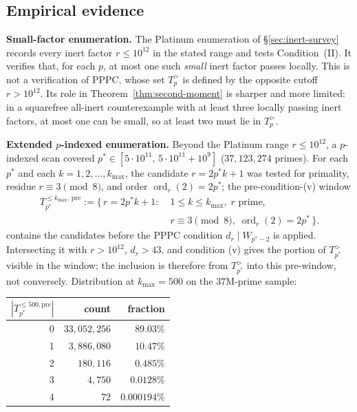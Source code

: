 \documentclass[11pt]{amsart}
\theoremstyle{plain}
\theoremstyle{definition}
\theoremstyle{remark}
\numberwithin{equation}{section}
\newcommand{\ord}{\operatorname{ord}}
\begin{document}
\subsection{Empirical evidence}\label{sec:empirical}

\textbf{Small-factor enumeration.} The Platinum enumeration of \S\ref{sec:inert-survey} records every inert factor $r \leq 10^{12}$ in the stated range and tests Condition~(II). It verifies that, for each $p$, at most one such \emph{small} inert factor passes locally. This is not a verification of PPPC, whose set $T_p^{>}$ is defined by the opposite cutoff $r>10^{12}$. Its role in Theorem~\ref{thm:second-moment} is sharper and more limited: in a squarefree all-inert counterexample with at least three locally passing inert factors, at most one can be small, so at least two must lie in $T_p^{>}$.

\textbf{Extended $p$-indexed enumeration.} Beyond the Platinum range $r \leq 10^{12}$, a $p$-indexed scan covered $p^\ast \in [5 \cdot 10^{11},\, 5 \cdot 10^{11} + 10^9]$ ($37{,}123{,}274$ primes). For each $p^\ast$ and each $k = 1, 2, \dots, k_{\max}$, the candidate $r = 2 p^\ast k + 1$ was tested for primality, residue $r \equiv 3 \pmod 8$, and order $\ord_r(2) = 2 p^\ast$; the pre-condition-(v) window
\[
  \begin{aligned}
  T_{p^\ast}^{\leq k_{\max},\,\mathrm{pre}} := \{\,r = 2 p^\ast k + 1 :\;& 1 \leq k \leq k_{\max},\; r \text{ prime},\\
  & r \equiv 3 \pmod 8,\; \ord_r(2) = 2 p^\ast\,\}.
  \end{aligned}
\]
contains the candidates before the PPPC condition $d_r \mid W_{p^\ast-2}$ is applied. Intersecting it with $r>10^{12}$, $d_r>43$, and condition (v) gives the portion of $T_{p^\ast}^{>}$ visible in the window; the inclusion is therefore from $T_{p^\ast}^{>}$ into this pre-window, not conversely. Distribution at $k_{\max} = 500$ on the $37$M-prime sample:

\begin{center}
\begin{tabular}{r r r}
\hline
$|T_{p^\ast}^{\leq 500,\mathrm{pre}}|$ & count & fraction \\
\hline
0 & $33{,}052{,}256$ & $89.03\%$ \\
1 & $3{,}886{,}080$ & $10.47\%$ \\
2 & $180{,}116$ & $0.485\%$ \\
3 & $4{,}750$ & $0.0128\%$ \\
4 & $72$ & $0.000194\%$ \\
\hline
\end{tabular}
\end{center}
\end{document}
